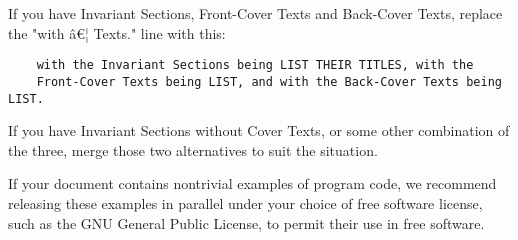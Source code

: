 If you have Invariant Sections, Front-Cover Texts and Back-Cover Texts,
replace the "with â€¦ Texts." line with this:

\begin{verbatim}
    with the Invariant Sections being LIST THEIR TITLES, with the
    Front-Cover Texts being LIST, and with the Back-Cover Texts being LIST.
\end{verbatim}

If you have Invariant Sections without Cover Texts, or some other
combination of the three, merge those two alternatives to suit the
situation.

If your document contains nontrivial examples of program code, we
recommend releasing these examples in parallel under your choice of free
software license, such as the GNU General Public License, to permit
their use in free software.
